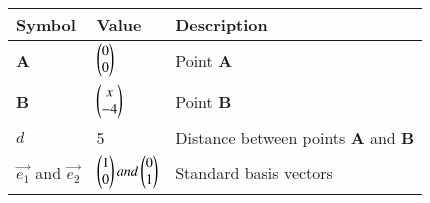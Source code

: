 \begin{tabular}{|m{5em} | m{5em} | m{10em} |}
	\hline
	\textbf{Symbol} & \textbf{Value} &\textbf{Description}\\
	\hline
		\textbf{A} & $\begin{pmatrix}0\\0\end{pmatrix}$ & Point \textbf{A}\\
	\hline
		\textbf{B} & $\begin{pmatrix}x\\-4\end{pmatrix}$ & Point \textbf{B}\\
	\hline
		$d$        & 5              & Distance between points \textbf{A} and \textbf{B}\\
	\hline
    $\vec{e_1}$ and $\vec{e_2}$ & $\begin{pmatrix}1\\0\end{pmatrix} and \begin{pmatrix}0\\1\end{pmatrix}$   &  Standard basis vectors\\
    \hline
\end{tabular}

